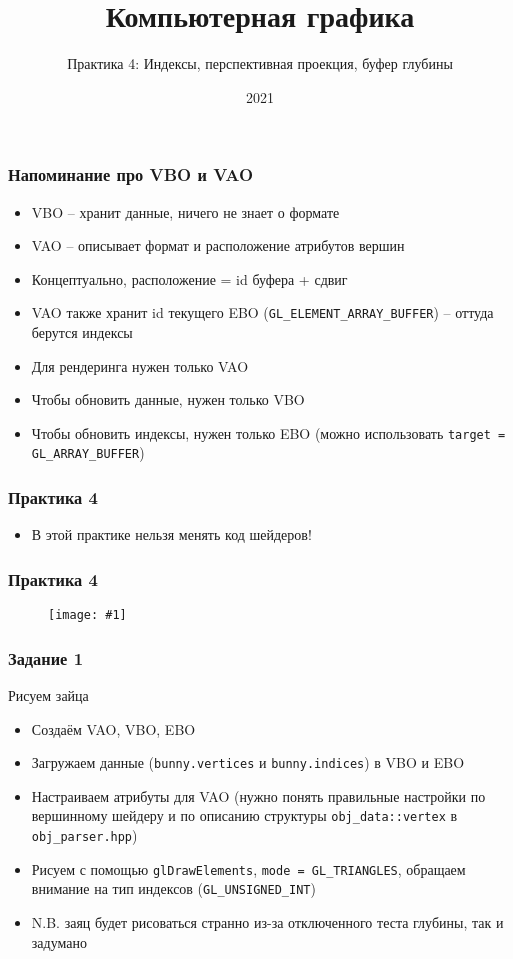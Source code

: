 \documentclass{beamer}
\title{Компьютерная графика}
\subtitle{Практика 4: Индексы, перспективная проекция, буфер глубины}
\date{2021}
\newcommand{\slideimage}[1]{
  \begin{figure}
    \begin{adjustbox}{width=\textwidth, totalheight=\textheight-2\baselineskip-2\baselineskip,keepaspectratio}
      \texttt{[image: \#1]}
    \end{adjustbox}
  \end{figure}
}
\begin{document}
\frame{\titlepage}

\begin{frame}[fragile]
\frametitle{Напоминание про VBO и VAO}
\begin{itemize}
\item VBO -- хранит данные, ничего не знает о формате
\item VAO -- описывает формат и расположение атрибутов вершин
\item Концептуально, расположение = id буфера + сдвиг
\item VAO также хранит id текущего EBO (\verb|GL_ELEMENT_ARRAY_BUFFER|) -- оттуда берутся индексы
\item Для рендеринга нужен только VAO
\item Чтобы обновить данные, нужен только VBO
\item Чтобы обновить индексы, нужен только EBO (можно использовать \verb|target = GL_ARRAY_BUFFER|)
\end{itemize}
\end{frame}

\begin{frame}[fragile]
\frametitle{Практика 4}
\begin{itemize}
\item В этой практике нельзя менять код шейдеров!
\end{itemize}
\end{frame}

\begin{frame}[fragile]
\frametitle{Практика 4}
\slideimage{0.png}
\end{frame}

\begin{frame}[fragile]
\frametitle{Задание 1}
Рисуем зайца
\begin{itemize}
\item Создаём VAO, VBO, EBO
\item Загружаем данные (\verb|bunny.vertices| и \verb|bunny.indices|) в VBO и EBO
\item Настраиваем атрибуты для VAO (нужно понять правильные настройки по вершинному шейдеру и по описанию структуры \verb|obj_data::vertex| в \verb|obj_parser.hpp|)
\item Рисуем с помощью \verb|glDrawElements|, \verb|mode = GL_TRIANGLES|, обращаем внимание на тип индексов (\verb|GL_UNSIGNED_INT|)
\item N.B. заяц будет рисоваться странно из-за отключенного теста глубины, так и задумано
\end{itemize}
\end{frame}
\end{document}
